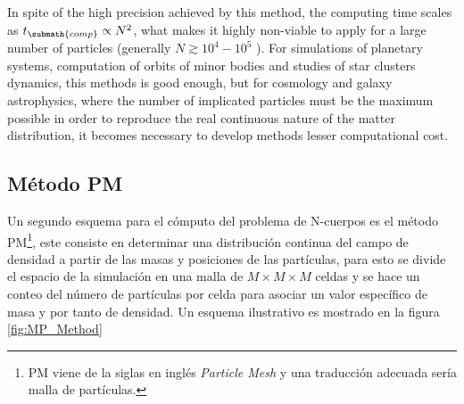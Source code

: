 In spite of the high precision achieved by this method, the computing time
scales as $t_{\submath{comp}}\propto N^2$, what makes it highly non-viable
to apply for a large number of particles (generally $N\gtrsim 10^4-10^5$ 
\cite{padmanabhan1995}). For simulations of planetary systems, computation
of orbits of minor bodies and studies of star clusters dynamics, this 
methods is good enough, but for cosmology and galaxy astrophysics, where 
the number of implicated particles must be the maximum possible in order 
to reproduce the real continuous nature of the matter distribution, it 
becomes necessary to develop methods lesser computational 
cost.



	\subsection{Método PM}
	\label{subsec:PMMethod}
	
	
Un segundo esquema para el cómputo del problema de N-cuerpos es el método 
PM\footnote{PM viene de la siglas en inglés \textit{Particle Mesh} y 
una traducción adecuada sería malla de partículas.}\cite{dawson1983}, este 
consiste en determinar una distribución continua del campo de densidad a 
partir de las masas y posiciones de las partículas, para esto se divide el 
espacio de la simulación en una malla de $M\times M\times M$ celdas y se 
hace un conteo del número de partículas por celda para asociar un valor 
específico de masa y por tanto de densidad. Un esquema ilustrativo es 
mostrado en la figura \ref{fig:MP_Method}


